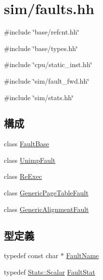 \hypertarget{sim_2faults_8hh}{
\section{sim/faults.hh}
\label{sim_2faults_8hh}
}
{\ttfamily \#include \char`\"{}base/refcnt.hh\char`\"{}}\par
{\ttfamily \#include \char`\"{}base/types.hh\char`\"{}}\par
{\ttfamily \#include \char`\"{}cpu/static\_\-inst.hh\char`\"{}}\par
{\ttfamily \#include \char`\"{}sim/fault\_\-fwd.hh\char`\"{}}\par
{\ttfamily \#include \char`\"{}sim/stats.hh\char`\"{}}\par
\subsection*{構成}
\begin{DoxyCompactItemize}
\item 
class \hyperlink{classFaultBase}{FaultBase}
\item 
class \hyperlink{classUnimpFault}{UnimpFault}
\item 
class \hyperlink{classReExec}{ReExec}
\item 
class \hyperlink{classGenericPageTableFault}{GenericPageTableFault}
\item 
class \hyperlink{classGenericAlignmentFault}{GenericAlignmentFault}
\end{DoxyCompactItemize}
\subsection*{型定義}
\begin{DoxyCompactItemize}
\item 
typedef const char $\ast$ \hyperlink{sim_2faults_8hh_abb196df64725e5c2568c900cf130d8d7}{FaultName}
\item 
typedef \hyperlink{classStats_1_1Scalar}{Stats::Scalar} \hyperlink{sim_2faults_8hh_afd21824d6eba50d78a4785991e6d122e}{FaultStat}
\end{DoxyCompactItemize}


